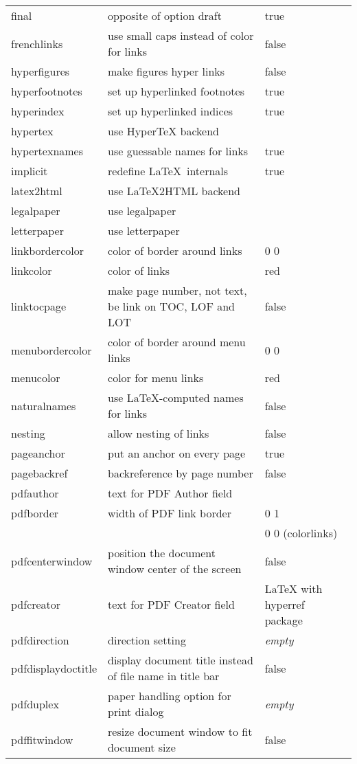 \documentclass[a4paper,11pt]{article}
\newcommand{\optempty}{{\rmfamily\textit{empty}}}
\newcommand*{\for}[1]{{\rmfamily(#1)}}
\begin{document}
\begin{longtable}{@{}>{\ttfamily}lp{70mm}>{\ttfamily}l@{}}
final &opposite of option draft&true\\
frenchlinks &use small caps instead of color for links&false\\
hyperfigures &make figures hyper links&false\\
hyperfootnotes &set up hyperlinked footnotes&true\\
hyperindex &set up hyperlinked indices&true\\
hypertex &use HyperTeX backend\\
hypertexnames &use guessable names for links&true\\
implicit &redefine \LaTeX\ internals&true\\
latex2html &use \LaTeX2HTML backend\\
legalpaper &use legalpaper\\
letterpaper &use letterpaper\\
linkbordercolor &color of border around links& 1 0 0\\
linkcolor &color of links&red\\
linktocpage &make page number, not text, be link on TOC, LOF and LOT&false\\
menubordercolor &color of border around menu links& 1 0 0\\
menucolor &color for menu links&red\\
naturalnames &use \LaTeX-computed names for links&false\\
nesting &allow nesting of links&false\\
pageanchor &put an anchor on every page&true\\
pagebackref &backreference by page number&false\\
pdfauthor &text for PDF Author field&\optempty\\
pdfborder &width of PDF link border&0 0 1\\
&&0 0 0 \for{colorlinks}\\
pdfcenterwindow &position the document window center of the screen&false\\
pdfcreator &text for PDF Creator field&LaTeX with hyperref package\\
pdfdirection & direction setting & \optempty\\
pdfdisplaydoctitle &display document title instead of file name in title bar&false\\
pdfduplex &paper handling option for print dialog& \optempty\\
pdffitwindow &resize document window to fit document size&false\\

\end{longtable}
\end{document}
